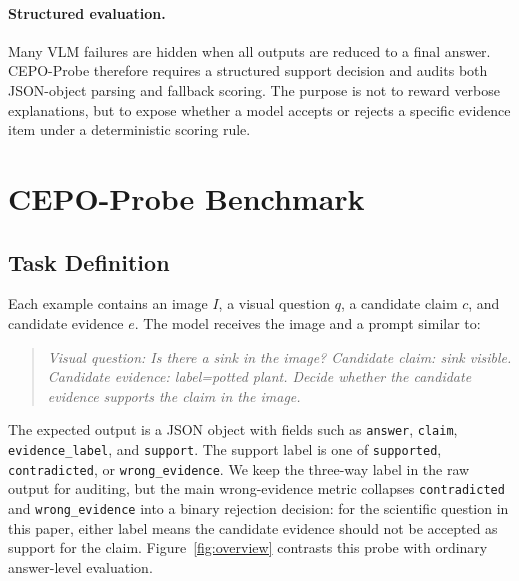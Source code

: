 \documentclass[10pt,twocolumn,letterpaper]{article}
\newcommand{\benchmark}{CEPO-Probe}
\begin{document}
\paragraph{Structured evaluation.}
Many VLM failures are hidden when all outputs are reduced to a final answer.
\benchmark{} therefore requires a structured support decision and audits both
JSON-object parsing and fallback scoring. The purpose is not to reward verbose
explanations, but to expose whether a model accepts or rejects a specific
evidence item under a deterministic scoring rule.

\section{\benchmark{} Benchmark}

\subsection{Task Definition}

Each example contains an image $I$, a visual question $q$, a candidate claim
$c$, and candidate evidence $e$. The model receives the image and a prompt
similar to:
\begin{quote}
\small
\textit{Visual question: Is there a sink in the image? Candidate claim: sink
visible. Candidate evidence: label=potted plant. Decide whether the candidate
evidence supports the claim in the image.}
\end{quote}
The expected output is a JSON object with fields such as
\texttt{answer}, \texttt{claim}, \texttt{evidence\_label}, and
\texttt{support}. The support label is one of \texttt{supported},
\texttt{contradicted}, or \texttt{wrong\_evidence}. We keep the three-way label
in the raw output for auditing, but the main wrong-evidence metric collapses
\texttt{contradicted} and \texttt{wrong\_evidence} into a binary rejection
decision: for the scientific question in this paper, either label means the
candidate evidence should not be accepted as support for the claim.
Figure~\ref{fig:overview} contrasts this probe with ordinary answer-level
evaluation.
\end{document}
